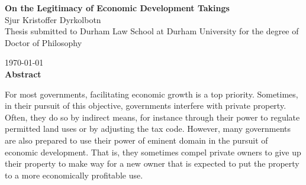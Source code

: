 

\cleardoublepage
{}

\begin{quoting}
  \singlespace
    \begin{center}
  {\LARGE \bfseries  On the Legitimacy of Economic Development Takings }\\
  \vspace*{0.5cm}
      {\large Sjur Kristoffer Dyrkolbotn}\\
  \vspace*{0.2cm}  
    {\normalsize Thesis submitted to Durham Law School at Durham University for the degree of Doctor of Philosophy}

  \vspace*{0.2cm}  
    {\normalsize \today}\\
  \vspace*{0.5cm}  
    {\normalsize \bfseries Abstract}      
  \end{center}
  {\parindent0pt
For most governments, facilitating economic growth is a top priority. Sometimes, in their pursuit of this objective, governments interfere with private property. Often, they do so by indirect means, for instance through their power to regulate permitted land uses or by adjusting the tax code. However, many governments are also prepared to use their power of eminent domain in the pursuit of economic development. That is, they sometimes compel private owners to give up their property to make way for a new owner that is expected to put the property to a more economically profitable use. %
}
\vspace{0.7mm}


\end{quoting}
